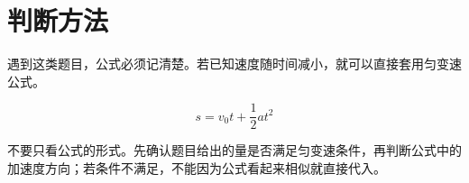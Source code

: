 \section{判断方法}

遇到这类题目，公式必须记清楚。若已知速度随时间减小，就可以直接套用匀变速公式。

\begin{equation}
  s=v_0t+\frac{1}{2}at^2
\end{equation}

不要只看公式的形式。先确认题目给出的量是否满足匀变速条件，再判断公式中的加速度方向；若条件不满足，不能因为公式看起来相似就直接代入。
